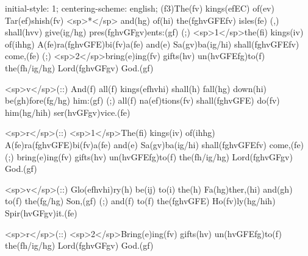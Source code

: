 initial-style: 1;
centering-scheme: english;
(f3)The(fv) kings(efEC) of(ev) Tar(ef)shish(fv) <sp>*</sp> and(hg) of(hi) the(fghvGFEfv) isles(fe) (,) shall(hvv) give(ig/hg) pres(fghvGFgv)ents:(gf) (;) <sp>1</sp>the(fi) kings(iv) of(ihhg) A(fe)ra(fghvGFE)bi(fv)a(fe) and(e) Sa(gv)ba(ig/hi) shall(fghvGFEfv) come,(fe) (;) <sp>2</sp>bring(e)ing(fv) gifts(hv) un(hvGFEfg)to(f) the(fh/ig/hg) Lord(fghvGFgv) God.(gf)

<sp>v</sp>(::) And(f) all(f) kings(efhvhi) shall(h) fall(hg) down(hi) be(gh)fore(fg/hg) him:(gf) (;) all(f) na(ef)tions(fv) shall(fghvGFE) do(fv) him(hg/hih) ser(hvGFgv)vice.(fe)

<sp>r</sp>(::) <sp>1</sp>The(fi) kings(iv) of(ihhg) A(fe)ra(fghvGFE)bi(fv)a(fe) and(e) Sa(gv)ba(ig/hi) shall(fghvGFEfv) come,(fe) (;) bring(e)ing(fv) gifts(hv) un(hvGFEfg)to(f) the(fh/ig/hg) Lord(fghvGFgv) God.(gf)

<sp>v</sp>(::) Glo(efhvhi)ry(h) be(ij) to(i) the(h) Fa(hg)ther,(hi) and(gh) to(f) the(fg/hg) Son,(gf) (;) and(f) to(f) the(fghvGFE) Ho(fv)ly(hg/hih) Spir(hvGFgv)it.(fe)

<sp>r</sp>(::) <sp>2</sp>Bring(e)ing(fv) gifts(hv) un(hvGFEfg)to(f) the(fh/ig/hg) Lord(fghvGFgv) God.(gf)